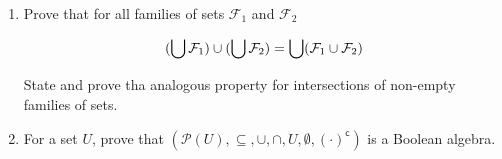 \documentclass[10pt,\jkfside,a4paper]{article}
\begin{document}
\begin{enumerate}

\item Prove that for all families of sets $\mathcal{F}_1$ and $\mathcal{F}_2$

\begin{equation}
(\bigcup\mathcal{F}_1)\cup(\bigcup\mathcal{F}_2) = \bigcup(\mathcal{F}_1\cup\mathcal{F}_2)\\
\end{equation}

State and prove tha analogous property for intersections of non-empty families of sets.

\item For a set $U$, prove that $(\mathcal{P}(U), \subseteq, \cup, \cap, U, \emptyset, (\cdot)^\mathsf{c})$ is a Boolean algebra.

\end{enumerate}
\end{document}

